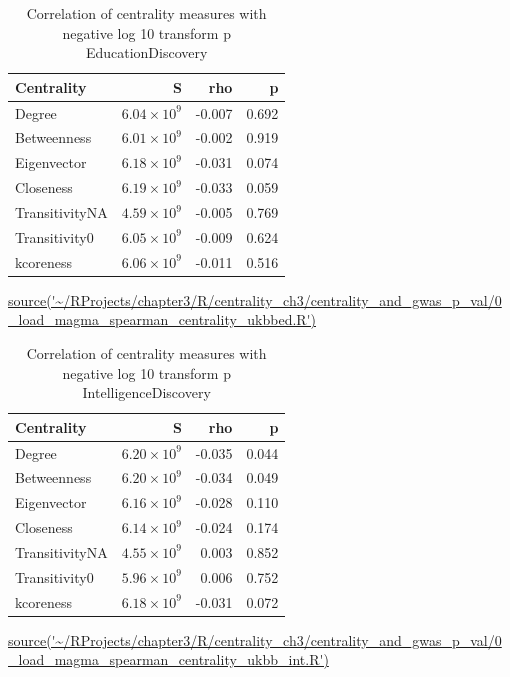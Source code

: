 \begin{table}[ht]
\centering
\begin{tabular}{lrrr}
  \toprule
Centrality & S & rho & p \\ 
  \midrule
Degree & $6.04 \times 10^{9}$ & -0.007 & 0.692 \\ 
  Betweenness & $6.01 \times 10^{9}$ & -0.002 & 0.919 \\ 
  Eigenvector & $6.18 \times 10^{9}$ & -0.031 & 0.074 \\ 
  Closeness & $6.19 \times 10^{9}$ & -0.033 & 0.059 \\ 
  TransitivityNA & $4.59 \times 10^{9}$ & -0.005 & 0.769 \\ 
  Transitivity0 & $6.05 \times 10^{9}$ & -0.009 & 0.624 \\ 
  kcoreness & $6.06 \times 10^{9}$ & -0.011 & 0.516 \\ 
   \bottomrule
\end{tabular}
\caption{Correlation of centrality measures with negative log 10 transform p EducationDiscovery} 
\tiny\url{source('~/RProjects/chapter3/R/centrality_ch3/centrality_and_gwas_p_val/0_load_magma_spearman_centrality_ukbbed.R')}
\label{tab:Correlation of centrality measures with negative log 10 transform p EducationDiscovery}
\end{table}


\begin{table}[ht]
\centering
\begin{tabular}{lrrr}
  \toprule
Centrality & S & rho & p \\ 
  \midrule
Degree & $6.20 \times 10^{9}$ & -0.035 & 0.044 \\ 
  Betweenness & $6.20 \times 10^{9}$ & -0.034 & 0.049 \\ 
  Eigenvector & $6.16 \times 10^{9}$ & -0.028 & 0.110 \\ 
  Closeness & $6.14 \times 10^{9}$ & -0.024 & 0.174 \\ 
  TransitivityNA & $4.55 \times 10^{9}$ & 0.003 & 0.852 \\ 
  Transitivity0 & $5.96 \times 10^{9}$ & 0.006 & 0.752 \\ 
  kcoreness & $6.18 \times 10^{9}$ & -0.031 & 0.072 \\ 
   \bottomrule
\end{tabular}
\caption{Correlation of centrality measures with negative log 10 transform p IntelligenceDiscovery} 
\tiny\url{source('~/RProjects/chapter3/R/centrality_ch3/centrality_and_gwas_p_val/0_load_magma_spearman_centrality_ukbb_int.R')}
\label{tab:Correlation of centrality measures with negative log 10 transform p IntelligenceDiscovery}
\end{table}



